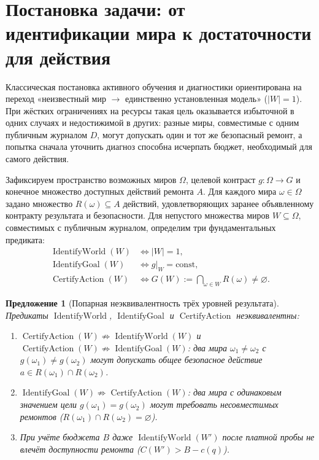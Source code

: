 \documentclass[11pt,a4paper]{article}
\theoremstyle{preprintthm}
\newtheorem{proposition}[theorem]{Предложение}
\theoremstyle{preprintdef}
\begin{document}
\section{Постановка задачи: от идентификации мира к достаточности для действия}

Классическая постановка активного обучения и диагностики ориентирована на переход «неизвестный мир $\to$ единственно установленная модель» ($|W|=1$). При жёстких ограничениях на ресурсы такая цель оказывается избыточной в одних случаях и недостижимой в других: разные миры, совместимые с одним публичным журналом $D$, могут допускать один и тот же безопасный ремонт, а попытка сначала уточнить диагноз способна исчерпать бюджет, необходимый для самого действия.

Зафиксируем пространство возможных миров $\Omega$, целевой контраст $g:\Omega\to G$ и конечное множество доступных действий ремонта $A$. Для каждого мира $\omega\in\Omega$ задано множество $R(\omega)\subseteq A$ действий, удовлетворяющих заранее объявленному контракту результата и безопасности. Для непустого множества миров $W\subseteq\Omega$, совместимых с публичным журналом, определим три фундаментальных предиката:
\begin{equation}
  \begin{aligned}
    \operatorname{IdentifyWorld}(W) &\iff |W|=1,\\
    \operatorname{IdentifyGoal}(W)  &\iff g|_W = \mathrm{const},\\
    \operatorname{CertifyAction}(W) &\iff G(W) := \bigcap_{\omega\in W} R(\omega) \ne \varnothing.
  \end{aligned}
\end{equation}

\begin{proposition}[Попарная неэквивалентность трёх уровней результата]
\label{prop:three_levels}
Предикаты $\operatorname{IdentifyWorld}$, $\operatorname{IdentifyGoal}$ и $\operatorname{CertifyAction}$ неэквивалентны:
\begin{enumerate}
  \item $\operatorname{CertifyAction}(W) \not\Rightarrow \operatorname{IdentifyWorld}(W)$ и $\operatorname{CertifyAction}(W) \not\Rightarrow \operatorname{IdentifyGoal}(W)$: два мира $\omega_1\ne\omega_2$ с $g(\omega_1)\ne g(\omega_2)$ могут допускать общее безопасное действие $a\in R(\omega_1)\cap R(\omega_2)$.
  \item $\operatorname{IdentifyGoal}(W) \not\Rightarrow \operatorname{CertifyAction}(W)$: два мира с одинаковым значением цели $g(\omega_1)=g(\omega_2)$ могут требовать несовместимых ремонтов ($R(\omega_1)\cap R(\omega_2)=\varnothing$).
  \item При учёте бюджета $B$ даже $\operatorname{IdentifyWorld}(W')$ после платной пробы не влечёт доступности ремонта ($C(W') > B - c(q)$).
\end{enumerate}
\end{proposition}
\end{document}
